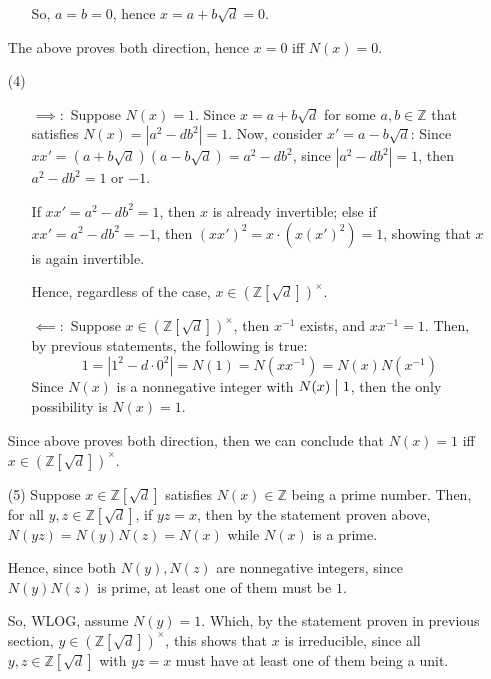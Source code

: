 \documentclass{article}
\begin{document}
\begin{itemize}
\begin{itemize}
        So, $a=b=0$, hence $x=a+b\sqrt{d}=0$.
    \end{itemize}

    The above proves both direction, hence $x=0$ iff $N(x)=0$.

    \hfil

    \item[(4)] \begin{itemize}
        \item[$\implies:$] Suppose $N(x)=1$. Since $x=a+b\sqrt{d}$ for some $a,b\in\mathbb{Z}$ that satisfies $N(x)=|a^2-db^2|=1$. 
        Now, consider $x'=a-b\sqrt{d}$: Since $xx' = (a+b\sqrt{d})(a-b\sqrt{d})=a^2-db^2$, since $|a^2-db^2|=1$, then $a^2-db^2=1$ or $-1$.

        If $xx'=a^2-db^2=1$, then $x$ is already invertible; else if $xx'=a^2-db^2=-1$, then $(xx')^2 = x\cdot (x(x')^2)=1$, showing that $x$ is again invertible.

        Hence, regardless of the case, $x\in(\mathbb{Z}[\sqrt{d}])^\times$.

        \item[$\impliedby:$] Suppose $x\in (\mathbb{Z}[\sqrt{d}])^\times$, then $x^{-1}$ exists, and $xx^{-1}=1$.
        Then, by previous statements, the following is true:
        $$1=|1^2-d\cdot 0^2|=N(1)=N(xx^{-1})=N(x)N(x^{-1})$$
        Since $N(x)$ is a nonnegative integer with $N(x)\bigm | 1$, then the only possibility is $N(x)=1$.
    \end{itemize}

    Since above proves both direction, then we can conclude that $N(x)=1$ iff $x\in(\mathbb{Z}[\sqrt{d}])^\times$.

    \hfil

    \item[(5)] Suppose $x\in\mathbb{Z}[\sqrt{d}]$ satisfies $N(x)\in\mathbb{Z}$ being a prime number. Then, for all $y,z\in\mathbb{Z}[\sqrt{d}]$,
    if $yz = x$, then by the statement proven above, $N(yz)=N(y)N(z)=N(x)$ while $N(x)$ is a prime.

    Hence, since both $N(y),N(z)$ are nonnegative integers, since $N(y)N(z)$ is prime, at least one of them must be $1$.

    So, WLOG, assume $N(y)=1$. Which, by the statement proven in previous section, $y\in (\mathbb{Z}[\sqrt{d}])^\times$, this shows that $x$ is irreducible,
    since all $y,z\in\mathbb{Z}[\sqrt{d}]$ with $yz = x$ must have at least one of them being a unit.
\end{itemize}
\end{document}
